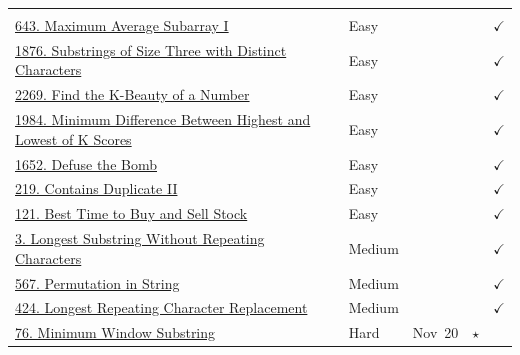 \documentclass{article}
\begin{document}
\begin{longtable}{p{7.5cm} l l c c}
\rowcolor{gray!20} \multicolumn{5}{l}{\textbf{3. Sliding Window}} \\
\href{https://leetcode.com/problems/maximum-average-subarray-i/}{643. Maximum Average Subarray I} & Easy & & & $\checkmark$ \\
\href{https://leetcode.com/problems/substrings-of-size-three-with-distinct-characters/}{1876. Substrings of Size Three with Distinct Characters} & Easy & & & $\checkmark$ \\
\href{https://leetcode.com/problems/find-the-k-beauty-of-a-number/}{2269. Find the K-Beauty of a Number} & Easy & & & $\checkmark$ \\
\href{https://leetcode.com/problems/minimum-difference-between-highest-and-lowest-of-k-scores/}{1984. Minimum Difference Between Highest and Lowest of K Scores} & Easy & & & $\checkmark$ \\
\href{https://leetcode.com/problems/defuse-the-bomb/}{1652. Defuse the Bomb} & Easy & & & $\checkmark$ \\
\href{https://leetcode.com/problems/contains-duplicate-ii/}{219. Contains Duplicate II} & Easy & & & $\checkmark$ \\
\href{https://leetcode.com/problems/best-time-to-buy-and-sell-stock/}{121. Best Time to Buy and Sell Stock} & Easy & & & $\checkmark$ \\
\href{https://leetcode.com/problems/longest-substring-without-repeating-characters/}{3. Longest Substring Without Repeating Characters} & Medium & & & $\checkmark$ \\
\href{https://leetcode.com/problems/permutation-in-string/}{567. Permutation in String} & Medium & & & $\checkmark$ \\
\href{https://leetcode.com/problems/longest-repeating-character-replacement/}{424. Longest Repeating Character Replacement} & Medium & & & $\checkmark$ \\
\href{https://leetcode.com/problems/minimum-window-substring/}{76. Minimum Window Substring} & Hard & Nov~20 & $\star$ & \\


\end{longtable}
\end{document}
